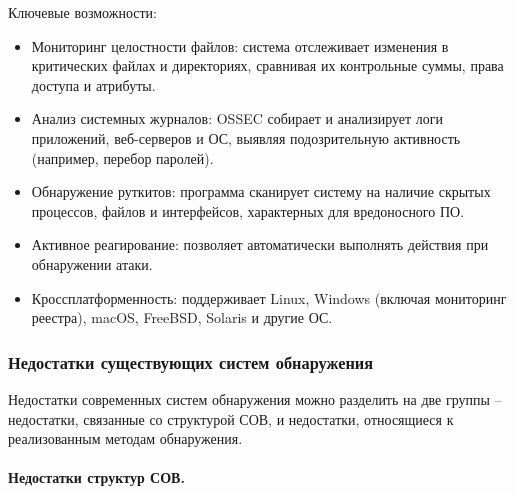 Ключевые возможности:
\begin{itemize}
	\item Мониторинг целостности файлов: система отслеживает изменения в критических файлах и директориях, сравнивая их контрольные суммы, права доступа и атрибуты.

	\item Анализ системных журналов: OSSEC собирает и анализирует логи приложений, веб-серверов и ОС, выявляя подозрительную активность (например, перебор паролей).

	\item Обнаружение руткитов: программа сканирует систему на наличие скрытых процессов, файлов и интерфейсов, характерных для вредоносного ПО.

	\item Активное реагирование: позволяет автоматически выполнять действия при обнаружении атаки.

	\item Кроссплатформенность: поддерживает Linux, Windows (включая мониторинг реестра), macOS, FreeBSD, Solaris и другие ОС.
\end{itemize}

\subsubsection{Недостатки существующих систем обнаружения}

Недостатки современных систем обнаружения можно разделить на две группы – недостатки, связанные со структурой СОВ, и недостатки, относящиеся к реализованным методам обнаружения.

\paragraph*{Недостатки структур СОВ.}

